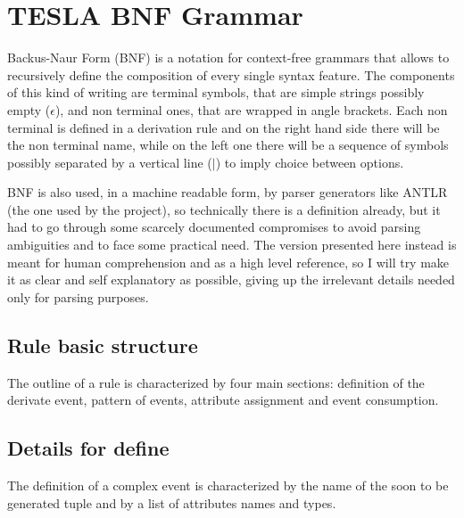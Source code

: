 \section{TESLA BNF Grammar}

Backus-Naur Form (BNF) is a notation for context-free grammars that allows to recursively define the composition of every single syntax feature. The components of this kind of writing are terminal symbols, that are simple strings possibly empty ($\epsilon$), and non terminal ones, that are wrapped in angle brackets. Each non terminal is defined in a derivation rule and on the right hand side there will be the non terminal name, while on the left one there will be a sequence of symbols possibly separated by a vertical line ($|$) to imply choice between options.

BNF is also used, in a machine readable form, by parser generators like ANTLR (the one used by the project), so technically there is a definition already, but it had to go through some scarcely documented compromises to avoid parsing ambiguities and to face some practical need. The version presented here instead is meant for human comprehension and as a high level reference, so I will try make it as clear and self explanatory as possible, giving up the irrelevant details needed only for parsing purposes.

\subsection{Rule basic structure}
The outline of a rule is characterized by four main sections: definition of the derivate event, pattern of events, attribute assignment and event consumption.
\begin{bnf*}
\end{bnf*}

\subsection{Details for define}
The definition of a complex event is characterized by the name of the soon to be generated tuple and by a list of attributes names and types.
\begin{bnf*}
\end{bnf*}
\begin{bnf*}
\\
\\
\\
\end{bnf*}

